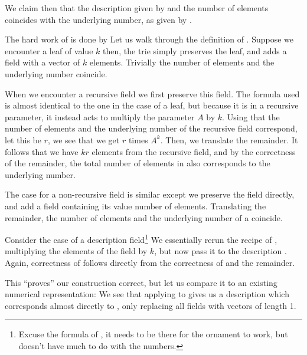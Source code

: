\begin{conjecture}
    We claim then that the description given by
    and the number of elements coincides with the underlying number, as given by .
\end{conjecture}
The hard work of  is done by
Let us walk through the definition of . Suppose we encounter a leaf of value $k$
then, the trie simply preserves the leaf, and adds a field with a vector of $k$ elements. Trivially the number of elements and the underlying number coincide.

When we encounter a recursive field
we first preserve this field. The formula used is almost identical to the one in the case of a leaf, but because it is in a recursive parameter, it instead acts to multiply the parameter $A$ by $k$. Using that the number of elements and the underlying number of the recursive field correspond, let this be $r$, we see that we get $r$ times $A^k$. Then, we translate the remainder. It follows that we have $kr$ elements from the recursive field, and by the correctness of the remainder, the total number of elements in  also corresponds to the underlying number.

The case for a non-recursive field is similar
except we preserve the field directly, and add a field containing its value number of elements. Translating the remainder, the number of elements and the underlying number of a  coincide.

Consider the case of a description field\footnote{Excuse the formula of , it needs to be there for the ornament to work, but doesn't have much to do with the numbers.}
We essentially rerun the recipe of , multiplying the elements of the field by $k$, but now pass it to the description . Again, correctness of  follows directly from the correctness of  and the remainder.

This ``proves'' our construction correct, but let us compare it to an existing numerical representation:
We see that applying  to  gives us a description which corresponds almost directly to , only replacing all fields with vectors of length 1.

